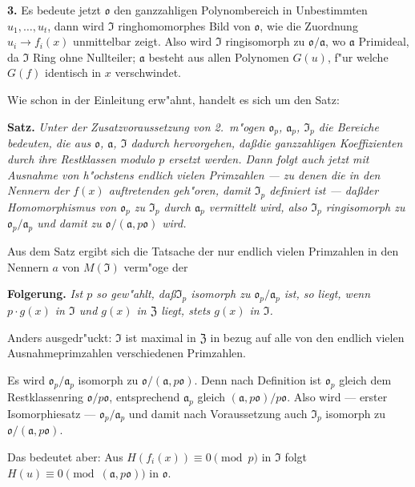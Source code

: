 \medskip\noindent\textbf{3.}
Es bedeute jetzt $\mathfrak{o}$ den ganzzahligen Polynombereich in Unbestimmten $u_1,\ldots,u_t$, dann wird $\mathfrak{I}$ ringhomomorphes Bild von $\mathfrak{o}$, wie die Zuordnung $u_i \to f_i(x)$ unmittelbar zeigt. Also wird $\mathfrak{I}$ ringisomorph zu $\mathfrak{o}/\mathfrak{a}$, wo $\mathfrak{a}$ Primideal, da $\mathfrak{I}$ Ring ohne Nullteiler; $\mathfrak{a}$ besteht aus allen Polynomen $G(u)$, f"ur welche $G(f)$ identisch in $x$ verschwindet.

Wie schon in der Einleitung erw"ahnt, handelt es sich um den Satz:

\medskip\noindent\textbf{Satz.}
\textit{Unter der Zusatzvoraussetzung von 2.\ m"ogen $\mathfrak{o}_p$, $\mathfrak{a}_p$, $\mathfrak{I}_p$ die Bereiche bedeuten, die aus $\mathfrak{o}$, $\mathfrak{a}$, $\mathfrak{I}$ dadurch hervorgehen, da\ss die ganzzahligen Koeffizienten durch ihre Restklassen modulo $p$ ersetzt werden. Dann folgt auch jetzt mit Ausnahme von h"ochstens endlich vielen Primzahlen --- zu denen die in den Nennern der $f(x)$ auftretenden geh"oren, damit $\mathfrak{I}_p$ definiert ist --- da\ss der Homomorphismus von $\mathfrak{o}_p$ zu $\mathfrak{I}_p$ durch $\mathfrak{a}_p$ vermittelt wird, also $\mathfrak{I}_p$ ringisomorph zu $\mathfrak{o}_p/\mathfrak{a}_p$ und damit zu $\mathfrak{o}/(\mathfrak{a}, p\mathfrak{o})$ wird.}

Aus dem Satz ergibt sich die Tatsache der nur endlich vielen Primzahlen in den Nennern $a$ von $M(\mathfrak{I})$ verm"oge der

\medskip\noindent\textbf{Folgerung.}
\textit{Ist $p$ so gew"ahlt, da\ss $\mathfrak{I}_p$ isomorph zu $\mathfrak{o}_p/\mathfrak{a}_p$ ist, so liegt, wenn $p \cdot g(x)$ in $\mathfrak{I}$ und $g(x)$ in $\mathfrak{Z}$ liegt, stets $g(x)$ in $\mathfrak{I}$.}

Anders ausgedr"uckt: $\mathfrak{I}$ ist maximal in $\mathfrak{Z}$ in bezug auf alle von den endlich vielen Ausnahmeprimzahlen verschiedenen Primzahlen.

Es wird $\mathfrak{o}_p/\mathfrak{a}_p$ isomorph zu $\mathfrak{o}/(\mathfrak{a}, p\mathfrak{o})$. Denn nach Definition ist $\mathfrak{o}_p$ gleich dem Restklassenring $\mathfrak{o}/p\mathfrak{o}$, entsprechend $\mathfrak{a}_p$ gleich $(\mathfrak{a}, p\mathfrak{o})/p\mathfrak{o}$. Also wird --- erster Isomorphiesatz --- $\mathfrak{o}_p/\mathfrak{a}_p$ und damit nach Voraussetzung auch $\mathfrak{I}_p$ isomorph zu $\mathfrak{o}/(\mathfrak{a}, p\mathfrak{o})$.

Das bedeutet aber: Aus $H(f_i(x)) \equiv 0 \pmod{p}$ in $\mathfrak{I}$ folgt $H(u) \equiv 0 \pmod{(\mathfrak{a}, p\mathfrak{o})}$ in $\mathfrak{o}$.

